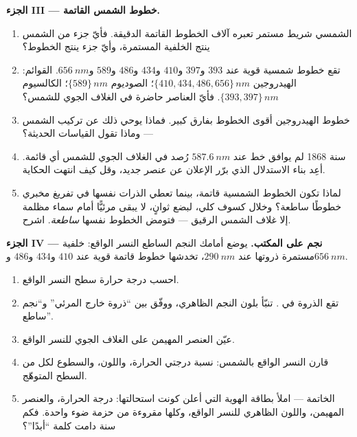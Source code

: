 \begin{problem}
\medskip
\noindent\textbf{الجزء III --- خطوط الشمس القاتمة.}
\begin{enumerate}[resume]
  \item {} الشمسي شريط مستمر تعبره آلاف
        الخطوط القاتمة الدقيقة. فأيّ جزء من الشمس ينتج الخلفية
        المستمرة، وأيّ جزء ينتج الخطوط؟
  \item تقع خطوط شمسية قوية عند $393$ و$397$ و$410$ و$434$ و$486$
        و$589$ و$\qty{656}{nm}$. القوائم: الهيدروجين
        $\{410, 434, 486, 656\}\,\unit{nm}$؛ الصوديوم $\{589\}\,\unit{nm}$؛
        الكالسيوم $\{393, 397\}\,\unit{nm}$. فأيّ العناصر حاضرة في
        الغلاف الجوي للشمس؟
  \item خطوط الهيدروجين أقوى الخطوط بفارق كبير. فماذا يوحي
        ذلك عن تركيب الشمس --- وماذا تقول القياسات
        الحديثة؟
  \item سنة 1868 لم يوافق خط عند $\qty{587.6}{nm}$ رُصد في الغلاف الجوي
        للشمس أي قائمة. أعِد بناء الاستدلال الذي
        برّر الإعلان عن عنصر جديد، وقل كيف انتهت الحكاية.
  \item لماذا تكون الخطوط الشمسية قاتمة، بينما تعطي الذرات نفسها في
        تفريغ مخبري خطوطًا ساطعة؟ وخلال كسوف كلي،
        لبضع ثوانٍ، لا يبقى مرئيًّا أمام سماء مظلمة إلا غلاف الشمس
        الرقيق --- فتومض الخطوط نفسها
        \emph{ساطعة}. اشرح.
\end{enumerate}

\medskip
\noindent\textbf{الجزء IV --- نجم على المكتب.}
يوضع أمامك  النجم الساطع النسر الواقع: خلفية
مستمرة ذروتها عند $\qty{290}{nm}$، تخدشها خطوط قاتمة قوية عند
$410$ و$434$ و$486$ و$\qty{656}{nm}$.
\begin{enumerate}[resume]
  \item احسب درجة حرارة سطح النسر الواقع.
  \item تقع الذروة في . تنبّأ بلون النجم
        الظاهري، ووفّق بين ``ذروة خارج المرئي'' و``نجم
        ساطع''.
  \item عيّن العنصر المهيمن على الغلاف الجوي للنسر الواقع.
  \item قارن النسر الواقع بالشمس: نسبة درجتي الحرارة، واللون،
        والسطوع لكل  من السطح المتوهّج.
  \item الخاتمة --- املأ بطاقة الهوية التي أعلن كونت
        استحالتها: درجة الحرارة، والعنصر المهيمن، واللون الظاهري
        للنسر الواقع، وكلها مقروءة من حزمة ضوء واحدة. فكم سنة
        دامت كلمة ``أبدًا''؟
\end{enumerate}
\end{problem}
